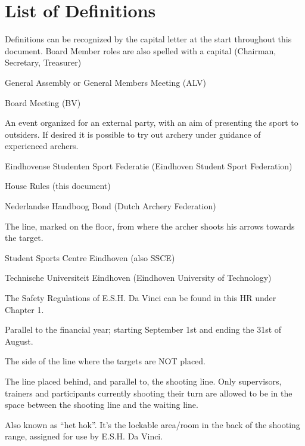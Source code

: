 \documentclass[a4paper]{article}
\begin{document}
\section*{List of Definitions}
{\g Definitions can be recognized by the capital letter at the start throughout this document. Board Member roles are also spelled with a capital (Chairman, Secretary, Treasurer)}

\begin{description}[font=\sffamily\bfseries, leftmargin=1cm, style=nextline]
  \item[GA]
    General Assembly or General Members Meeting (ALV)
  \item[BM]
    Board Meeting (BV)
  \item[Workshop]
    An event organized for an external party, with an aim of presenting the sport to outsiders. If desired it is possible to try out archery under guidance of experienced archers.
    \item[ESSF]
    Eindhovense Studenten Sport Federatie (Eindhoven Student Sport Federation)
    \item[HR]
    House Rules (this document)
    \item[NHB]
    Nederlandse Handboog Bond (Dutch Archery Federation)
    \item[Shooting line]
    The line, marked on the floor, from where the archer shoots his arrows towards the target.
    \item[SSC]
    Student Sports Centre Eindhoven (also SSCE)
    \item[TU/e]
    Technische Universiteit Eindhoven (Eindhoven University of Technology)
    \item[Safety Rules]
    The Safety Regulations of E.S.H. Da Vinci can be found in this HR under Chapter 1.
    \item[Association Year]
    Parallel to the financial year; starting September 1st and ending the 31st of August. 
    \item[“Behind the line”]
    The side of the line where the targets are NOT placed. 
    \item[Waiting line]
The line placed behind, and parallel to, the shooting line. Only supervisors, trainers and participants currently shooting their turn are allowed to be in the space between the shooting line and the waiting line. 
\item[Club Room] Also known as “het hok”. It’s the lockable area/room in the back of the shooting range, assigned for use by E.S.H. Da Vinci.
\item[Member]

\end{description}
\end{document}
